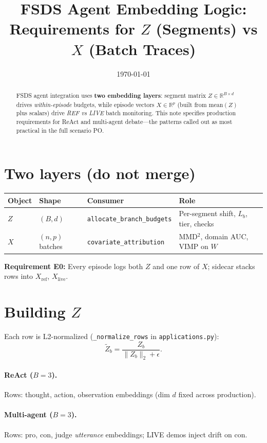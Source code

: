 \documentclass[11pt]{article}
\title{FSDS Agent Embedding Logic:\\
Requirements for $Z$ (Segments) vs $X$ (Batch Traces)}
\date{\today}
\begin{document}
\maketitle

\begin{abstract}
FSDS agent integration uses \textbf{two embedding layers}: segment matrix $Z\in\mathbb{R}^{B\times d}$ drives \emph{within-episode} budgets, while episode vectors $X\in\mathbb{R}^{p}$ (built from $\mathrm{mean}(Z)$ plus scalars) drive \emph{REF vs LIVE} batch monitoring.
This note specifies production requirements for ReAct and multi-agent debate---the patterns called out as most practical in the full scenario PO.
\end{abstract}

\section{Two layers (do not merge)}
\begin{center}
\begin{tabular}{@{}llll@{}}
\toprule
Object & Shape & Consumer & Role \\
\midrule
$Z$ & $(B,d)$ & \texttt{allocate\_branch\_budgets} & Per-segment shift, $L_b$, tier, checks \\
$X$ & $(n,p)$ batches & \texttt{covariate\_attribution} & MMD$^2$, domain AUC, VIMP on $W$ \\
\bottomrule
\end{tabular}
\end{center}
\textbf{Requirement E0:} Every episode logs both $Z$ and one row of $X$; sidecar stacks rows into $X_{\mathrm{ref}}$, $X_{\mathrm{live}}$.

\section{Building $Z$}
Each row is L2-normalized (\texttt{\_normalize\_rows} in \texttt{applications.py}):
\[
\tilde{Z}_b = \frac{Z_b}{\|Z_b\|_2+\epsilon}.
\]
\paragraph{ReAct ($B=3$).} Rows: thought, action, observation embeddings (dim $d$ fixed across production).
\paragraph{Multi-agent ($B=3$).} Rows: pro, con, judge \emph{utterance} embeddings; LIVE demos inject drift on con.
\end{document}
